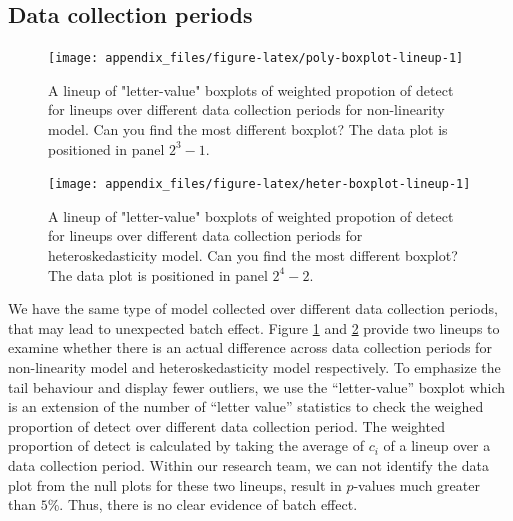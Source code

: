\documentclass[]{interact}
\theoremstyle{plain}%
\theoremstyle{definition}
\theoremstyle{remark}
\begin{document}
\hypertarget{data-collection-periods}{%
\subsection{Data collection periods}\label{data-collection-periods}}

\begin{figure}

{\centering \texttt{[image: appendix\_files/figure-latex/poly-boxplot-lineup-1]} 

}

\caption{A lineup of "letter-value" boxplots of weighted propotion of detect for lineups over different data collection periods for non-linearity model. Can you find the most different boxplot? The data plot is positioned in panel $2^3 - 1$.}\label{fig:poly-boxplot-lineup}
\end{figure}

\begin{figure}

{\centering \texttt{[image: appendix\_files/figure-latex/heter-boxplot-lineup-1]} 

}

\caption{A lineup of "letter-value" boxplots of weighted propotion of detect for lineups over different data collection periods for heteroskedasticity model. Can you find the most different boxplot? The data plot is positioned in panel $2^4 - 2$.}\label{fig:heter-boxplot-lineup}
\end{figure}

We have the same type of model collected over different data collection
periods, that may lead to unexpected batch effect. Figure
\ref{fig:poly-boxplot-lineup} and \ref{fig:heter-boxplot-lineup} provide
two lineups to examine whether there is an actual difference across data
collection periods for non-linearity model and heteroskedasticity model
respectively. To emphasize the tail behaviour and display fewer
outliers, we use the ``letter-value'' boxplot \citep{hofmann2017value}
which is an extension of the number of ``letter value'' statistics to
check the weighed proportion of detect over different data collection
period. The weighted proportion of detect is calculated by taking the
average of \(c_i\) of a lineup over a data collection period. Within our
research team, we can not identify the data plot from the null plots for
these two lineups, result in \(p\)-values much greater than \(5\)\%.
Thus, there is no clear evidence of batch effect.



\end{document}

